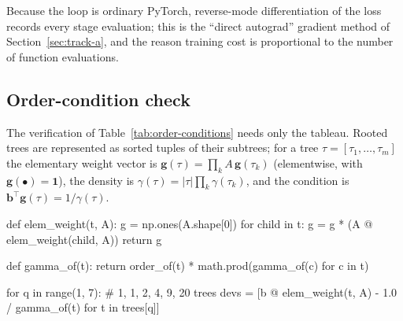 Because the loop is ordinary PyTorch, reverse-mode differentiation of the loss
records every stage evaluation; this is the ``direct autograd'' gradient
method of Section~\ref{sec:track-a}, and the reason training cost is
proportional to the number of function evaluations.

\subsection{Order-condition check}

The verification of Table~\ref{tab:order-conditions} needs only the
tableau. Rooted trees are represented as sorted tuples of their subtrees;
for a tree $\tau=[\tau_1,\dots,\tau_m]$ the elementary weight vector is
$\mathbf{g}(\tau)=\prod_k A\,\mathbf{g}(\tau_k)$ (elementwise, with
$\mathbf{g}(\bullet)=\mathbf{1}$), the density is
$\gamma(\tau)=|\tau|\prod_k\gamma(\tau_k)$, and the condition is
$\mathbf{b}^\top\mathbf{g}(\tau)=1/\gamma(\tau)$.

\begin{pycode}
def elem_weight(t, A):
    g = np.ones(A.shape[0])
    for child in t:
        g = g * (A @ elem_weight(child, A))
    return g

def gamma_of(t):
    return order_of(t) * math.prod(gamma_of(c) for c in t)

for q in range(1, 7):                  # 1, 1, 2, 4, 9, 20 trees
    devs = [b @ elem_weight(t, A) - 1.0 / gamma_of(t) for t in trees[q]]
\end{pycode}
